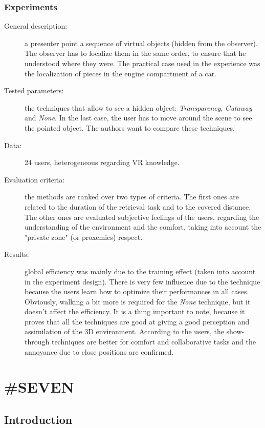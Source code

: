 \documentclass[a4paper]{article}
\begin{document}
\subsubsection{Experiments}
\begin{description}
	\item[General description:] a presenter point a sequence of virtual objects (hidden from the observer). The observer has to localize them in the same order, to ensure that he understood where they were. The practical case used in the experience was the localization of pieces in the engine compartment of a car.
	\item[Tested parameters:] the techniques that allow to see a hidden object: \textit{Transparency}, \textit{Cutaway} and \textit{None}. In the last case, the user has to move around the scene to see the pointed object. The authors want to compare these techniques.
	\item[Data:] 24 users, heterogeneous regarding VR knowledge.
	\item[Evaluation criteria:] the methods are ranked over two types of criteria. The first ones are related to the duration of the retrieval task and to the covered distance. The other ones are evaluated subjective feelings of the users, regarding the understanding of the environment and the comfort, taking into account the "private zone" (or proxemics) respect.
	\item[Results:] global efficiency was mainly due to the training effect (taken into account in the experiment design). There is very few influence due to the technique because the users learn how to optimize their performances in all cases. Obviously, walking a bit more is required for the \textit{None} technique, but it doesn't affect the efficiency. It is a thing important to note, because it proves that all the techniques are good at giving a good perception and assimilation of the 3D environment. According to the users, the show-through techniques are better for comfort and collaborative tasks and the annoyance due to close positions are confirmed.
\end{description}

\section{\#SEVEN}

\subsection{Introduction}
\end{document}

